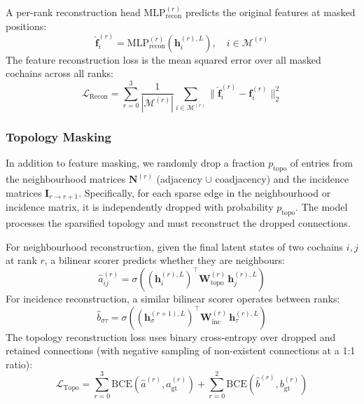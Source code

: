 \documentclass{article}
\begin{document}
A per-rank reconstruction head $\text{MLP}_{\text{recon}}^{(r)}$ predicts the original features at masked positions:
\begin{equation}
    \hat{\mathbf{f}}_i^{(r)} = \text{MLP}_{\text{recon}}^{(r)}(\mathbf{h}_i^{(r),L}), \quad i \in \mathcal{M}^{(r)}
\end{equation}
The feature reconstruction loss is the mean squared error over all masked cochains across all ranks:
\begin{equation}
    \mathcal{L}_{\text{Recon}} = \sum_{r=0}^{3} \frac{1}{|\mathcal{M}^{(r)}|} \sum_{i \in \mathcal{M}^{(r)}} \|\hat{\mathbf{f}}_i^{(r)} - \mathbf{f}_i^{(r)}\|_2^2
\end{equation}

\subsubsection{Topology Masking}

In addition to feature masking, we randomly drop a fraction $p_{\text{topo}}$ of entries from the neighbourhood matrices $\mathbf{N}^{(r)}$ (adjacency $\cup$ coadjacency) and the incidence matrices $\mathbf{I}_{r \to r+1}$. Specifically, for each sparse edge in the neighbourhood or incidence matrix, it is independently dropped with probability $p_{\text{topo}}$. The model processes the sparsified topology and must reconstruct the dropped connections.

For neighbourhood reconstruction, given the final latent states of two cochains $i, j$ at rank $r$, a bilinear scorer predicts whether they are neighbours:
\begin{equation}
    \hat{a}_{ij}^{(r)} = \sigma\left((\mathbf{h}_i^{(r),L})^\top \mathbf{W}_{\text{topo}}^{(r)} \, \mathbf{h}_j^{(r),L}\right)
\end{equation}
For incidence reconstruction, a similar bilinear scorer operates between ranks:
\begin{equation}
    \hat{b}_{\sigma\tau} = \sigma\left((\mathbf{h}_\sigma^{(r+1),L})^\top \mathbf{W}_{\text{inc}}^{(r)} \, \mathbf{h}_\tau^{(r),L}\right)
\end{equation}
The topology reconstruction loss uses binary cross-entropy over dropped and retained connections (with negative sampling of non-existent connections at a 1:1 ratio):
\begin{equation}
    \mathcal{L}_{\text{Topo}} = \sum_{r=0}^{3} \text{BCE}(\hat{a}^{(r)}, a^{(r)}_{\text{gt}}) + \sum_{r=0}^{2} \text{BCE}(\hat{b}^{(r)}, b^{(r)}_{\text{gt}})
\end{equation}
\end{document}
